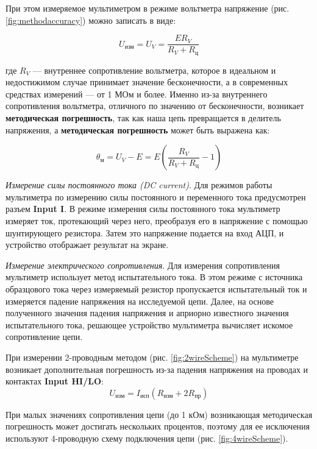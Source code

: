 \documentclass[12pt,a4paper]{article}
\begin{document}
При этом измеряемое мультиметром в режиме вольтметра напряжение (рис. 
\ref{fig:methodaccuracy}) можно записать в виде:

\begin{equation*}
U_{\text{изм}} = U_{V} = \frac{ER_V}{R_V + R_{\text{ц}}}
\end{equation*}

где $R_V$ — внутреннее сопротивление вольтметра, которое в идеальном и
недостижимом случае принимает значение бесконечности, а в современных 
средствах измерений — от 1 МОм и более. Именно из-за внутреннего 
сопротивления вольтметра, отличного по значению от бесконечности, 
возникает \textbf{методическая погрешность}, так как наша цепь превращается в 
делитель напряжения, а \textbf{методическая погрешность} может быть выражена как:

\begin{equation*}
	\theta_{\text{м}} = U_V - E = E\left(\frac{R_V}{R_V + R_{\text{ц}}} - 1\right)
\end{equation*}

\textit{Измерение силы постоянного тока (DC current)}. Для режимов работы мультиметра по измерению силы постоянного
и переменного тока предусмотрен разъем \textbf{Input I}. В режиме измерения силы постоянного 
тока мультиметр измеряет ток, протекающий через него, преобразуя его в напряжение 
с помощью шунтирующего резистора. Затем это напряжение подается на вход АЦП, 
и устройство отображает результат на экране.

\textit{Измерение электрического сопротивления}. Для измерения сопротивления мультиметр 
использует метод испытательного тока. В этом
режиме с источника образцового тока через измеряемый резистор пропускается 
испытательный ток и измеряется падение напряжения на исследуемой цепи. Далее, 
на основе полученного значения падения напряжения и априорно известного 
значения испытательного тока, решающее устройство мультиметра вычисляет искомое 
сопротивление цепи.

При измерении 2-проводным методом (рис. \ref{fig:2wireScheme}) на мультиметре возникает дополнительная погрешность 
из-за падения напряжения на проводах и контактах \textbf{Input HI/LO}:
$$
U_{\text{изм}} = I_{\text{исп}}(R_{\text{изм}} + 2R_{\text{пр}})
$$

При малых значениях сопротивления цепи (до 1 кОм) возникающая методическая погрешность 
может достигать нескольких процентов, поэтому для ее исключения используют 
4-проводную схему подключения цепи (рис. \ref{fig:4wireScheme}).
\end{document}
